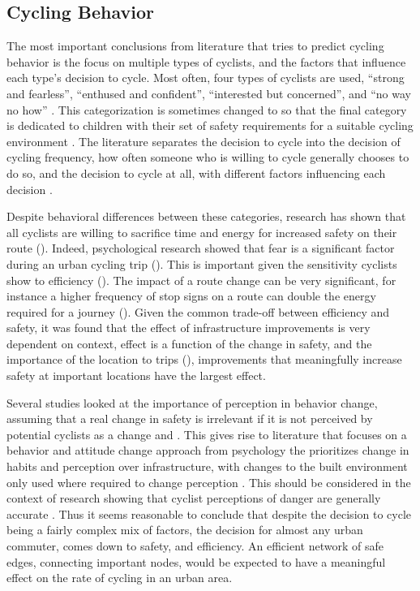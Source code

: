 
\subsection{Cycling Behavior}

The most important conclusions from literature that tries to predict cycling behavior is the focus on multiple types of cyclists, and the factors that influence each type's decision to cycle. Most often, four types of cyclists are used, ``strong and fearless'', ``enthused and confident'', ``interested but concerned'', and ``no way no how'' \parencite{dill2013four}. This categorization is sometimes changed to so that the final category is dedicated to children with their set of safety requirements for a suitable cycling environment \parencite{mekuria2012low}. The literature separates the decision to cycle into the decision of cycling frequency, how often someone who is willing to cycle generally chooses to do so, and the decision to cycle at all, with different factors influencing each decision \parencite{stinson2005comparison}. 

Despite behavioral differences between these categories, research has shown that all cyclists are willing to sacrifice time and energy for increased safety on their route (\cite{winters2011motivators}). Indeed, psychological research showed that fear is a significant factor during an urban cycling trip (\cite{ellett2018state}). This is important given the sensitivity cyclists show to efficiency (\cite{wuerzer2015cycling}). The impact of a route change can be very significant, for instance a higher frequency of stop signs on a route can double the energy required for a journey (\cite{fajans2001bicyclists}). Given the common trade-off between efficiency and safety, it was found that the effect of infrastructure improvements is very dependent on context, effect is a function of the change in safety, and the importance of the location to trips (\cite{kondo2018bike}), improvements that meaningfully increase safety at important locations have the largest effect. 

Several studies looked at the importance of perception in behavior change, assuming that a real change in safety is irrelevant if it is not perceived by potential cyclists as a change \parencite{li2012physical} and \parencite{parkin2007models}. This gives rise to literature that focuses on a behavior and attitude change approach from psychology the prioritizes change in habits and perception over infrastructure, with changes to the built environment only used where required to change perception \parencite{savan2017integrated}. This should be considered in the context of research showing that cyclist perceptions of danger are generally accurate \parencite{vandenbulcke2014predicting}. Thus it seems reasonable to conclude that despite the decision to cycle being a fairly complex mix of factors, the decision for almost any urban commuter, comes down to safety, and efficiency. An efficient network of safe edges, connecting important nodes, would be expected to have a meaningful effect on the rate of cycling in an urban area.  

